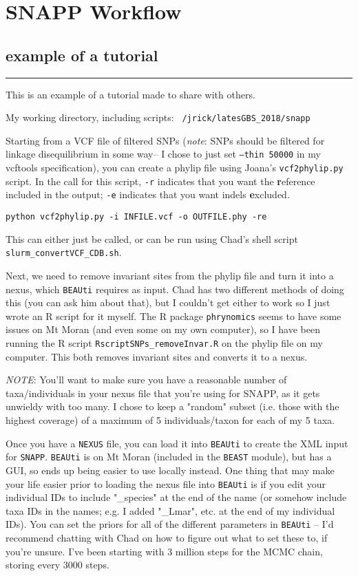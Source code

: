 \section{SNAPP Workflow}
\subsection*{example of a tutorial}
\hrule
This is an example of a tutorial made to share with others.

My working directory, including scripts: \texttt{~/jrick/latesGBS\_2018/snapp}

Starting from a VCF file of filtered SNPs (\textit{note}: SNPs should be filtered for linkage disequilibrium in some way-- I chose to just set \texttt{--thin 50000} in my vcftools specification), you can create a phylip file using Joana's \texttt{vcf2phylip.py} script. In the call for this script, \texttt{-r} indicates that you want the \textbf{r}eference included in the output; \texttt{-e} indicates that you want indels \textbf{e}xcluded.

\begin{verbatim}
python vcf2phylip.py -i INFILE.vcf -o OUTFILE.phy -re
\end{verbatim}

This can either just be called, or can be run using Chad's shell script \texttt{slurm\_convertVCF\_CDB.sh}.

Next, we need to remove invariant sites from the phylip file and turn it into a nexus, which \texttt{BEAUti} requires as input. Chad has two different methods of doing this (you can ask him about that), but I couldn't get either to work so I just wrote an R script for it myself. The R package \texttt{phrynomics} seems to have some issues on Mt Moran (and even some on my own computer), so I have been running the R script \texttt{RscriptSNPs\_removeInvar.R} on the phylip file on my computer. This both removes invariant sites and converts it to a nexus.

\textit{NOTE}: You'll want to make sure you have a reasonable number of taxa/individuals in your nexus file that you're using for SNAPP, as it gets unwieldy with too many. I chose to keep a "random" subset (i.e. those with the highest coverage) of a maximum of 5 individuals/taxon for each of my 5 taxa.

Once you have a \texttt{NEXUS} file, you can load it into \texttt{BEAUti} to create the XML input for \texttt{SNAPP}. \texttt{BEAUti} is on Mt Moran (included in the \texttt{BEAST} module), but has a GUI, so ends up being easier to use locally instead. One thing that may make your life easier prior to loading the nexus file into \texttt{BEAUti} is if you edit your individual IDs to include "\_species" at the end of the name (or somehow include taxa IDs in the names; e.g. I added "\_Lmar", etc. at the end of my individual IDs). You can set the priors for all of the different parameters in \texttt{BEAUti} -- I'd recommend chatting with Chad on how to figure out what to set these to, if you're unsure. I've been starting with 3 million steps for the MCMC chain, storing every 3000 steps.

